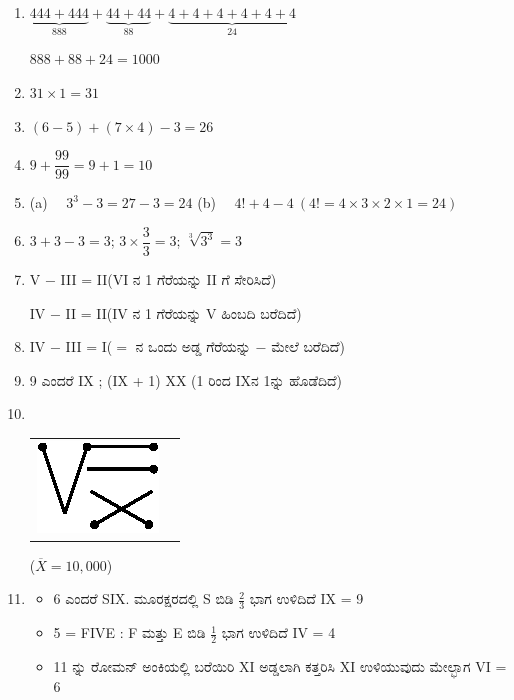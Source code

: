 \begin{enumerate}
\itemsep=5pt

\item $\underbrace{444 + 444}_{888} + \underbrace{44 + 44}_{88} + \underbrace{4 + 4 + 4 + 4 + 4 + 4}_{24}$

$888 + 88 + 24 = 1000$

\item $31 \times 1 = 31$

\item $(6- 5) + (7 \times 4) - 3 = 26$

\item $9 + \dfrac{99}{99} = 9 + 1 = 10$

\item {\fontsize{11pt}{13pt}\selectfont(a)~~ $3^{3} - 3 = 27 - 3 = 24$ \quad (b)~~  $4! + 4 - 4 \ (4! = 4 \times 3 \times 2 \times 1 = 24)$}\relax


\item $3 + 3 - 3 = 3$; $3 \times \dfrac{3}{3} = 3$; $\sqrt[3]{3^{3}} = 3$

\item V $-$ III = II\quad (VI ನ 1 ಗೆರೆಯನ್ನು II ಗೆ ಸೇರಿಸಿದೆ)

IV $-$ II = II\quad (IV ನ 1 ಗೆರೆಯನ್ನು  V ಹಿಂಬದಿ ಬರೆದಿದೆ)

\item IV $-$ III = I\quad ($=$ ನ ಒಂದು ಅಡ್ಡ ಗೆರೆಯನ್ನು $-$ ಮೇಲೆ ಬರೆದಿದೆ)

\item 9 ಎಂದರೆ IX ; (IX + 1) XX (1 ರಿಂದ IXನ 1ನ್ನು ಹೊಡೆದಿದೆ)

\item 
~

\begin{tabular}[t]{cc}
\includegraphics[scale =0.7]{images/chap4/ans10.eps} & \raisebox{.5cm}{= $\sqrt{10,000} = 100$}
\end{tabular}

($\overline{X} = 10,000$)


\item 
\begin{itemize}
\item[(a)] 6 ಎಂದರೆ SIX. ಮೂರಕ್ಷರದಲ್ಲಿ S ಬಿಡಿ $\frac{2}{3}$ ಭಾಗ ಉಳಿದಿದೆ IX = 9
\item[(b)] 5 = FIVE : F ಮತ್ತು E ಬಿಡಿ $\frac{1}{2}$ ಭಾಗ ಉಳಿದಿದೆ  IV = 4
\item[(c)] 11 ನ್ನು ರೋಮನ್ ಅಂಕಿಯಲ್ಲಿ ಬರೆಯಿರಿ XI ಅಡ್ಡಲಾಗಿ ಕತ್ತರಿಸಿ XI ಉಳಿಯುವುದು ಮೇಲ್ಭಾಗ VI = 6
\end{itemize}



\end{enumerate}
